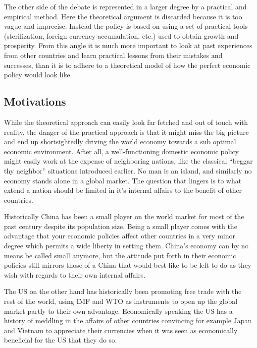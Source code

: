 The other side of the debate is represented in a larger degree by a 
practical and empirical method. Here the theoretical argument is 
discarded because it is too vague and imprecise. Instead the policy is 
based on using a set of practical tools (sterilization, foreign currency 
accumulation, etc.) used to obtain growth and prosperity. From this 
angle it is much more important to look at past experiences from other 
countries and learn practical lessons from their mistakes and successes, 
than it is to adhere to a theoretical model of how the perfect economic 
policy would look like.





\subsection{Motivations}

While the theoretical approach can easily look far fetched and out of 
touch with reality, the danger of the practical approach is that it 
might miss the big picture and end up shortsightedly driving the world 
economy towards a sub optimal economic environment. After all, a 
well-functioning domestic economic policy might easily work at the 
expense of neighboring nations, like the classical ``beggar thy 
neighbor'' situations introduced earlier. No man is an island, and 
similarly no economy stands alone in a global market. The question that 
lingers is to what extend a nation should be limited in it's internal 
affairs to the benefit of other countries.

Historically China has been a small player on the world market for most 
of the past century despite its population size. Being a small player 
comes with the advantage that your economic policies affect other 
countries in a very minor degree which permits a wide liberty in setting 
them. China's economy can by no means be called small anymore, but the 
attitude put forth in their economic policies still mirrors those of a 
China that would best like to be left to do as they wish with regards to 
their own internal affairs.

The US on the other hand has historically been promoting free trade with 
the rest of the world, using IMF and WTO as instruments to open up the 
global market partly to their own advantage. Economically speaking the 
US has a history of meddling in the affairs of other countries 
convincing for example Japan and Vietnam to appreciate their currencies 
when it was seen as economically beneficial for the US that they do so.

